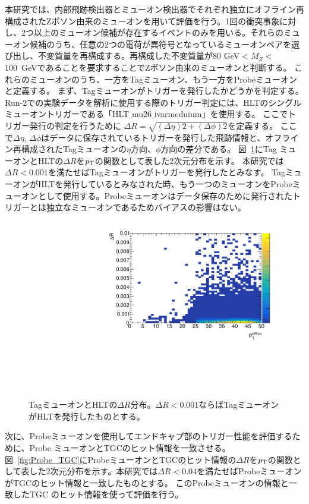 本研究では、内部飛跡検出器とミューオン検出器でそれぞれ独立にオフライン再構成されたZボソン由来のミューオンを用いて評価を行う。1回の衝突事象に対し、2つ以上のミューオン候補が存在するイベントのみを用いる。それらのミューオン候補のうち、任意の2つの電荷が異符号となっているミューオンペアを選び出し、不変質量を再構成する。再構成した不変質量が80 GeV$<M_Z<$100~GeVであることを要求することでZボソン由来のミューオンと判断する。
これらのミューオンのうち、一方をTagミューオン、もう一方をProbeミューオンと定義する。
まず、Tagミューオンがトリガーを発行したかどうかを判定する。Run-2での実験データを解析に使用する際のトリガー判定には、HLTのシングルミューオントリガーである「HLT$\_$mu26$\_$ivarmeduium」を使用する。
ここでトリガー発行の判定を行うために $\Delta R= \sqrt{(\Delta \eta)2 + (\Delta \phi)2}$を定義する。
ここで$\Delta\eta$, $\Delta\phi$はデータに保存されているトリガーを発行した飛跡情報と、オフライン再構成されたTagミューオンの$\eta$方向、$\phi$方向の差分である。
図~\ref{fig:tag_HLT}にTag ミューオンとHLTの$\Delta R$を$p_{\rm{T}}$の関数として表した2次元分布を示す。
本研究では$\Delta R< 0.001$を満たせばTagミューオンがトリガーを発行したとみなす。
TagミューオンがHLTを発行しているとみなされた時、もう一つのミューオンをProbeミューオンとして使用する。Probeミューオンはデータ保存のために発行されたトリガーとは独立なミューオンであるためバイアスの影響はない。

\begin{figure}[htb]
  \centering
  \includegraphics[clip, width=11cm]{fig/3/dR_tag_HLT.pdf}
  \caption{TagミューオンとHLTの$\Delta R$分布。$\Delta R<0.001$ならばTagミューオンがHLTを発行したものとする。}
  \label{fig:tag_HLT}
\end{figure}

次に、Probeミューオンを使用してエンドキャプ部のトリガー性能を評価するために、Probe ミューオンとTGCのヒット情報を一致させる。図~\ref{fig:Probe_TGC}にProbeミューオンとTGCのヒット情報の$\Delta R$を$p_{\rm{T}}$の関数として表した2次元分布を示す。本研究では$\Delta R<0.04$を満たせばProbeミューオンがTGCのヒット情報と一致したものとする。
このProbeミューオンの情報と一致したTGC のヒット情報を使って評価を行う。

